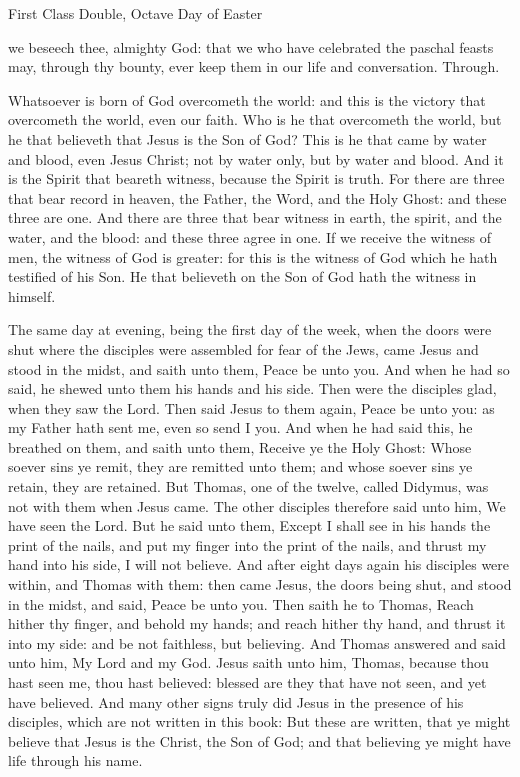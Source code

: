 \begin{inhead}
    {First Class Double, Octave Day of Easter}
\end{inhead}


\collect
{} we beseech thee, almighty God: that we who have celebrated the paschal feasts may, through thy bounty, ever keep them in our life and conversation. Through.

 Whatsoever is born of God overcometh the world: and this is the victory that overcometh the world, even our faith. Who is he that overcometh the world, but he that believeth that Jesus is the Son of God? This is he that came by water and blood, even Jesus Christ; not by water only, but by water and blood. And it is the Spirit that beareth witness, because the Spirit is truth. For there are three that bear record in heaven, the Father, the Word, and the Holy Ghost: and these three are one. And there are three that bear witness in earth, the spirit, and the water, and the blood: and these three agree in one. If we receive the witness of men, the witness of God is greater: for this is the witness of God which he hath testified of his Son. He that believeth on the Son of God hath the witness in himself.

 The same day at evening, being the first day of the week, when the doors were shut where the disciples were assembled for fear of the Jews, came Jesus and stood in the midst, and saith unto them, Peace be unto you. And when he had so said, he shewed unto them his hands and his side. Then were the disciples glad, when they saw the Lord. Then said Jesus to them again, Peace be unto you: as my Father hath sent me, even so send I you. And when he had said this, he breathed on them, and saith unto them, Receive ye the Holy Ghost: Whose soever sins ye remit, they are remitted unto them; and whose soever sins ye retain, they are retained. But Thomas, one of the twelve, called Didymus, was not with them when Jesus came. The other disciples therefore said unto him, We have seen the Lord. But he said unto them, Except I shall see in his hands the print of the nails, and put my finger into the print of the nails, and thrust my hand into his side, I will not believe. And after eight days again his disciples were within, and Thomas with them: then came Jesus, the doors being shut, and stood in the midst, and said, Peace be unto you. Then saith he to Thomas, Reach hither thy finger, and behold my hands; and reach hither thy hand, and thrust it into my side: and be not faithless, but believing. And Thomas answered and said unto him, My Lord and my God. Jesus saith unto him, Thomas, because thou hast seen me, thou hast believed: blessed are they that have not seen, and yet have believed. And many other signs truly did Jesus in the presence of his disciples, which are not written in this book: But these are written, that ye might believe that Jesus is the Christ, the Son of God; and that believing ye might have life through his name.


